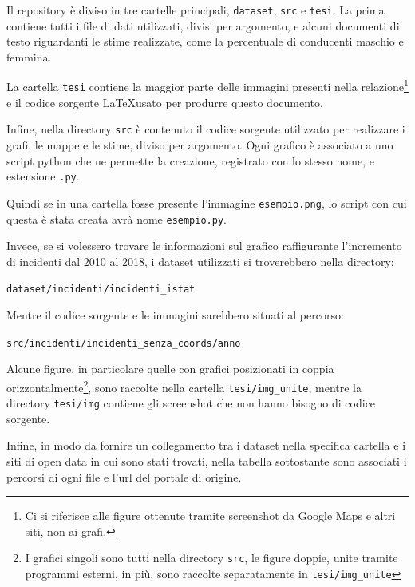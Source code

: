 \documentclass[a4paper,12pt]{report}
\newcommand{\columnstyle}[1]{\texttt{#1}}
\newcommand{\filenamestyle}[1]{\texttt{#1}}
\newcommand{\skipline}{\vspace{0.2in}}
\begin{document}
Il repository è diviso in tre cartelle principali, \filenamestyle{dataset}, \filenamestyle{src} 
e \filenamestyle{tesi}. La prima contiene tutti i file di dati utilizzati, divisi per 
argomento, e alcuni documenti di testo riguardanti le stime realizzate, come la percentuale di 
conducenti maschio e femmina. 

La cartella \columnstyle{tesi}
 contiene la maggior parte delle immagini presenti 
nella relazione\footnote{Ci si riferisce alle figure ottenute tramite screenshot 
da Google Maps e altri siti, non ai grafi.} 
e il codice sorgente \LaTeX usato per produrre questo documento.

Infine, nella directory \filenamestyle{src} è contenuto il codice sorgente utilizzato 
per realizzare i grafi, le mappe e le stime, diviso per argomento. 
Ogni grafico è associato a uno script python che ne permette la creazione, registrato con 
lo stesso nome, e estensione \filenamestyle{.py}. 

Quindi se in una cartella fosse presente l'immagine \filenamestyle{esempio.png}, lo script con 
cui questa è stata creata avrà nome \filenamestyle{esempio.py}. 

Invece, se si volessero trovare le informazioni sul grafico raffigurante 
l'incremento di incidenti dal 2010 al 2018, i dataset utilizzati si troverebbero 
nella directory:

\skipline
\indent\filenamestyle{dataset/incidenti/incidenti\_istat}

\skipline
\noindent Mentre il codice sorgente e le immagini sarebbero situati al percorso:

\skipline
\indent\filenamestyle{src/incidenti/incidenti\_senza\_coords/anno}

\skipline
Alcune figure, in particolare quelle con grafici posizionati in coppia 
orizzontalmente\footnote{I grafici singoli sono tutti nella directory \filenamestyle{src}, 
le figure doppie, unite tramite programmi esterni, in più, sono raccolte separatamente 
in \filenamestyle{tesi/img\_unite}}, 
sono raccolte nella cartella \filenamestyle{tesi/img\_unite}, 
mentre la directory \filenamestyle{tesi/img} contiene gli screenshot 
che non hanno bisogno di codice sorgente. 

Infine, in modo da fornire un collegamento tra i dataset nella specifica cartella e i siti 
di open data in cui sono stati trovati, nella tabella sottostante sono associati i percorsi di 
ogni file e l'url del portale di origine. 
\end{document}
